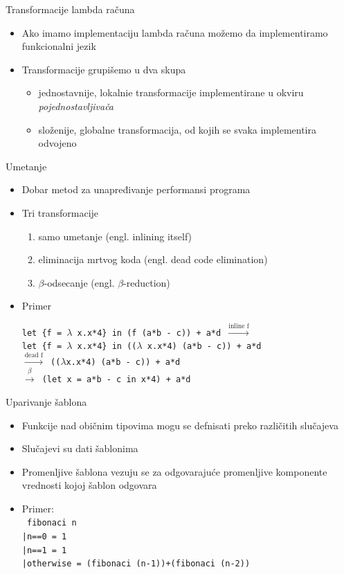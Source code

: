 \documentclass[xcolor={dvipsnames}, 11pt]{beamer}
\begin{document}
\begin{frame}{Transformacije lambda računa}
	\begin{itemize}
		\item Ako imamo implementaciju lambda računa možemo da implementiramo funkcionalni jezik
		\item Transformacije grupišemo u dva skupa
		\begin{itemize}
			\item jednostavnije, lokalnie transformacije implementirane u okviru \textit{pojednostavljivača}
			\item složenije, globalne transformacija, od kojih se svaka
			implementira odvojeno
		\end{itemize}
	\end{itemize}
\end{frame}

\begin{frame}{Umetanje}
	\begin{itemize}
		\item Dobar metod za unapređivanje performansi programa	
		\item Tri transformacije
		\begin{enumerate}
			\item samo umetanje (engl. inlining itself)
			\item eliminacija mrtvog koda (engl. dead code elimination)
			\item $\beta$-odsecanje (engl. $\beta$-reduction)
		\end{enumerate}
		\item Primer
			\begin{center}
			\texttt{let \{f = $\lambda$ x.x*4\} in (f (a*b - c)) + a*d
				$\stackrel{\text{inline f}}{\longrightarrow}$ \\ let \{f = $\lambda$ x.x*4\} in (($\lambda$ x.x*4) (a*b - c)) + a*d \\ $\stackrel{\text{dead f}}{\longrightarrow}$ (($\lambda$x.x*4) (a*b - c)) + a*d \\
				$\stackrel{\beta}{\longrightarrow}$ (let {x = a*b - c} in x*4) + a*d}
		\end{center}
	\end{itemize}
	

	
\end{frame}

\begin{frame}{Uparivanje šablona}
	\begin{itemize}
		\item Funkcije nad običnim tipovima mogu se defnisati preko različitih slučajeva
		\item Slučajevi su dati šablonima
		\item Promenljive šablona vezuju se za odgovarajuće promenljive komponente vrednosti kojoj šablon odgovara
		\item Primer:\\
		\texttt{
		fibonaci n
		\\ |n==0 = 1
		\\ |n==1 = 1
		\\ |otherwise = (fibonaci (n-1))+(fibonaci (n-2))}
	\end{itemize}
\end{frame}
\end{document}
